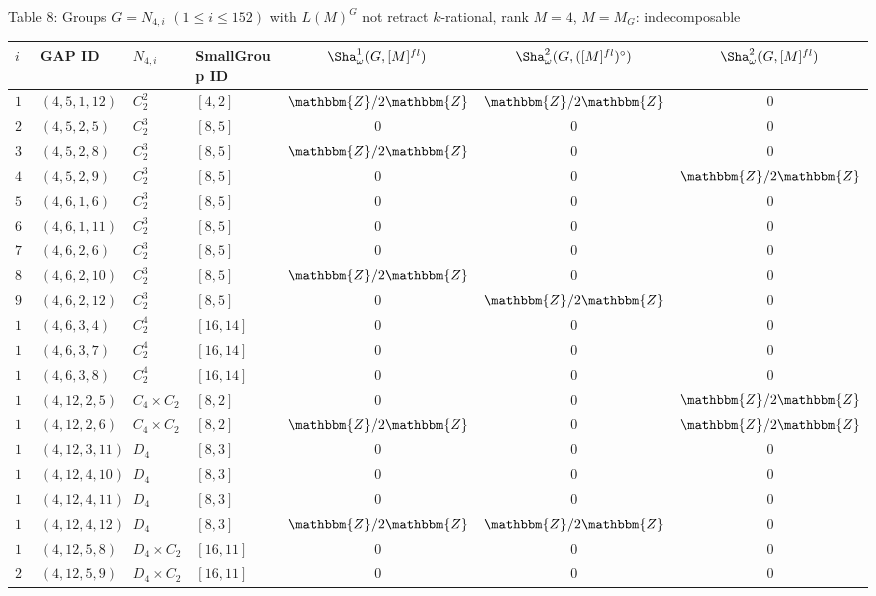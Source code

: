 \documentclass{amsart}
\theoremstyle{plain}
\theoremstyle{definition}
\theoremstyle{remark}
\newcommand{\bZ}{\mathbbm{Z}}\newcommand{\bQ}{\mathbbm{Q}}
\begin{document}
Table $8$: 
Groups $G=N_{4,i}$ $(1\leq i\leq 152)$ 
with $L(M)^G$ not retract $k$-rational, 
rank $M=4$, $M=M_G$: indecomposable
{\small 
\begin{longtable}{llll|ccc}
$i$ & GAP ID & $N_{4,i}$ & SmallGroup ID 
& $\Sha^1_\omega(G,[M]^{fl})$ & $\Sha^2_\omega(G,([M]^{fl})^\circ)$ & $\Sha^2_\omega(G,[M]^{fl})$\\\hline
\endfirsthead
%
$1$ & $( 4, 5, 1, 12 )$ & $C_2^2$ & $[ 4, 2 ]$& $\bZ/2\bZ$ & $\bZ/2\bZ$ & $0$\\
$2$ & $( 4, 5, 2, 5 )$ & $C_2^3$ & $[ 8, 5 ]$& $0$ & $0$ & $0$\\
$3$ & $( 4, 5, 2, 8 )$ & $C_2^3$ & $[ 8, 5 ]$& $\bZ/2\bZ$ & $0$ & $0$\\
$4$ & $( 4, 5, 2, 9 )$ & $C_2^3$ & $[ 8, 5 ]$& $0$ & $0$ & $\bZ/2\bZ$\\
$5$ & $( 4, 6, 1, 6 )$ & $C_2^3$ & $[ 8, 5 ]$& $0$ & $0$ & $0$\\
$6$ & $( 4, 6, 1, 11 )$ & $C_2^3$ & $[ 8, 5 ]$& $0$ & $0$ & $0$\\
$7$ & $( 4, 6, 2, 6 )$ & $C_2^3$ & $[ 8, 5 ]$& $0$ & $0$ & $0$\\
$8$ & $( 4, 6, 2, 10 )$ & $C_2^3$ & $[ 8, 5 ]$& $\bZ/2\bZ$ & $0$ & $0$\\
$9$ & $( 4, 6, 2, 12 )$ & $C_2^3$ & $[ 8, 5 ]$& $0$ & $\bZ/2\bZ$ & $0$\\
$10$ & $( 4, 6, 3, 4 )$ & $C_2^4$ & $[ 16, 14 ]$& $0$ & $0$ & $0$\\
$11$ & $( 4, 6, 3, 7 )$ & $C_2^4$ & $[ 16, 14 ]$& $0$ & $0$ & $0$\\
$12$ & $( 4, 6, 3, 8 )$ & $C_2^4$ & $[ 16, 14 ]$& $0$ & $0$ & $0$\\
$13$ & $( 4, 12, 2, 5 )$ & $C_4 \times C_2$ & $[ 8, 2 ]$& $0$ & $0$ & $\bZ/2\bZ$\\
$14$ & $( 4, 12, 2, 6 )$ & $C_4 \times C_2$ & $[ 8, 2 ]$& $\bZ/2\bZ$ & $0$ & $\bZ/2\bZ$\\
$15$ & $( 4, 12, 3, 11 )$ & $D_4$ & $[ 8, 3 ]$& $0$ & $0$ & $0$\\
$16$ & $( 4, 12, 4, 10 )$ & $D_4$ & $[ 8, 3 ]$& $0$ & $0$ & $0$\\
$17$ & $( 4, 12, 4, 11 )$ & $D_4$ & $[ 8, 3 ]$& $0$ & $0$ & $0$\\
$18$ & $( 4, 12, 4, 12 )$ & $D_4$ & $[ 8, 3 ]$& $\bZ/2\bZ$ & $\bZ/2\bZ$ & $0$\\
$19$ & $( 4, 12, 5, 8 )$ & $D_4\times C_2$ & $[ 16, 11 ]$& $0$ & $0$ & $0$\\
$20$ & $( 4, 12, 5, 9 )$ & $D_4\times C_2$ & $[ 16, 11 ]$& $0$ & $0$ & $0$\\

\end{longtable}}
\end{document}
